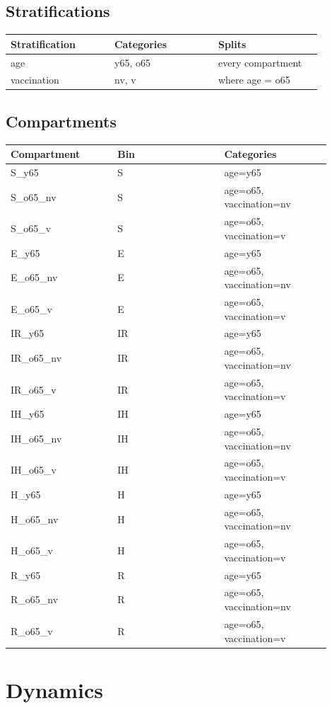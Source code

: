 \documentclass{article}
\begin{document}
\subsection*{Stratifications}
\begin{longtable}{p{0.3\linewidth}p{0.3\linewidth}p{0.3\linewidth}}
Stratification & Categories & Splits \\
\hline
\endhead
age & y65, o65 & every compartment \\
vaccination & nv, v & where age = o65 \\
\end{longtable}
\subsection*{Compartments}
\begin{longtable}{p{0.3\linewidth}p{0.3\linewidth}p{0.3\linewidth}}
Compartment & Bin & Categories \\
\hline
\endhead
S\_y65 & S & age=y65 \\
S\_o65\_nv & S & age=o65, vaccination=nv \\
S\_o65\_v & S & age=o65, vaccination=v \\
E\_y65 & E & age=y65 \\
E\_o65\_nv & E & age=o65, vaccination=nv \\
E\_o65\_v & E & age=o65, vaccination=v \\
IR\_y65 & IR & age=y65 \\
IR\_o65\_nv & IR & age=o65, vaccination=nv \\
IR\_o65\_v & IR & age=o65, vaccination=v \\
IH\_y65 & IH & age=y65 \\
IH\_o65\_nv & IH & age=o65, vaccination=nv \\
IH\_o65\_v & IH & age=o65, vaccination=v \\
H\_y65 & H & age=y65 \\
H\_o65\_nv & H & age=o65, vaccination=nv \\
H\_o65\_v & H & age=o65, vaccination=v \\
R\_y65 & R & age=y65 \\
R\_o65\_nv & R & age=o65, vaccination=nv \\
R\_o65\_v & R & age=o65, vaccination=v \\
\end{longtable}
\section*{Dynamics}
\end{document}
